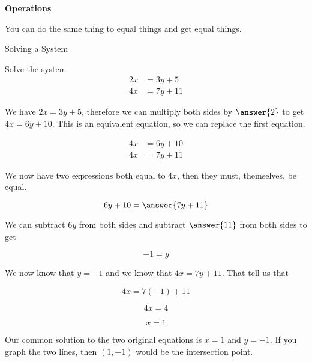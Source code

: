 \documentclass{ximera}
\begin{document}
\begin{fact} \textbf{\textcolor{purple!85!blue}{Operations}} 

You can do the same thing to equal things and get equal things.

\end{fact}






\begin{example} Solving a System


Solve the system
\begin{align*}
2x & = 3y + 5 \\
4x & = 7y + 11
\end{align*}



\begin{explanation}

We have $2x = 3y + 5$, therefore we can multiply both sides by $\answer{2}$ to get $4x = 6y + 10$.  This is an equivalent equation, so we can replace the first equation.

\begin{align*}
4x & = 6y + 10 \\
4x & = 7y + 11
\end{align*}


We now have two expressions both equal to $4x$, then they must, themselves, be equal.


\[   6y + 10 =  \answer{7y + 11}   \]

We can subtract $6y$ from both sides and subtract $\answer{11}$ from both sides to get


\[   -1 =  y   \]



We now know that $y=-1$ and we know that $4x = 7y + 11$.  That tell us that 


\[   4x = 7(-1) + 11   \]

\[   4x = 4   \]


\[ x = 1 \]


Our common solution to the two original equations is $x = 1$ and $y = -1$.  If you graph the two lines, then $(1, -1)$ would be the intersection point.

\end{explanation}
\end{example}
\end{document}
